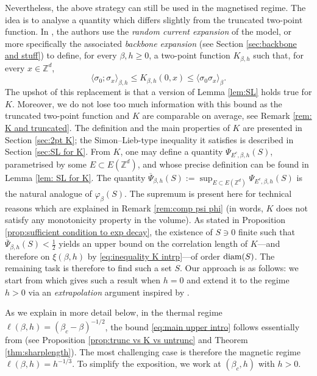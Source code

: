 \documentclass[11pt,a4paper]{article}
\numberwithin{equation}{section}
\theoremstyle{plain}
\theoremstyle{definition}
\begin{document}
Nevertheless, the above strategy can still be used in the magnetised regime. The idea is to analyse a quantity which differs slightly from the truncated two-point function. In \cite{AizenmanFernandezCriticalBehaviorMagnetization1986}, the authors use the \emph{random current expansion} of the model, or more specifically the associated \emph{backbone expansion} (see Section \ref{sec:backbone and stuff}) to define, for every $\beta,h\geq 0$, a two-point function $K_{\beta,h}$ such that, for every $x\in \mathbb Z^d$,
\begin{equation}\label{eq:inequality K intrp}
	\langle \sigma_0;\sigma_x\rangle_{\beta,h}\leq K_{\beta,h}(0,x)\leq \langle \sigma_0\sigma_x\rangle_{\beta}.
\end{equation}
The upshot of this replacement is that a version of Lemma \ref{lem:SL} holds true for $K$. Moreover, we do not lose too much information with this bound as the truncated two-point function and $K$ are comparable on average, see Remark \ref{rem: K and truncated}. The definition and the main properties of $K$ are presented in Section \ref{sec:2pt K}; the Simon--Lieb-type inequality it satisfies is described in Section \ref{sec:SL for K}. From $K$, one may define a quantity $\Psi_{E^c,\beta,h}(S)$, parametrised by some $E\subset E(\mathbb Z^d)$, and whose precise definition can be found in Lemma \ref{lem: SL for K}. The quantity $\overline{\Psi}_{\beta,h}(S):=\sup_{E\subset E(\mathbb Z^d)}\Psi_{E^c,\beta,h}(S)$ is the natural analogue of $\varphi_{\beta}(S)$. The supremum is present here for technical reasons which are explained in Remark \ref{rem:comp psi phi} (in words, $K$ does not satisfy any monotonicity property in the volume). As stated in Proposition \ref{prop:sufficient condition to exp decay}, the existence of $S\ni 0$ finite such that $\overline{\Psi}_{\beta,h}(S)< \tfrac{1}{2}$ yields an upper bound on the correlation length of $K$---and therefore on $\xi(\beta,h)$ by \eqref{eq:inequality K intrp}---of order $\textup{diam}(S)$. The remaining task is therefore to find such a set $S$. Our approach is as follows: we start from \cite{DuminilPanis2024newLB} which gives such a result when $h=0$ and extend it to the regime $h>0$ via an 
\emph{extrapolation} argument inspired by \cite{AizenmanFernandezCriticalBehaviorMagnetization1986}. 

As we explain in more detail below, in the thermal regime $\ell(\beta,h)=(\beta_c-\beta)^{-1/2}$, the bound \eqref{eq:main upper intro} follows essentially from \cite{DuminilPanis2024newLB} (see Proposition \ref{prop:trunc vs K vs untrunc} and Theorem \ref{thm:sharplength}). The most challenging case is therefore the magnetic regime $\ell(\beta,h)=h^{-1/3}$. To simplify the exposition, we work at $(\beta_c,h)$ with $h>0$.
\end{document}
